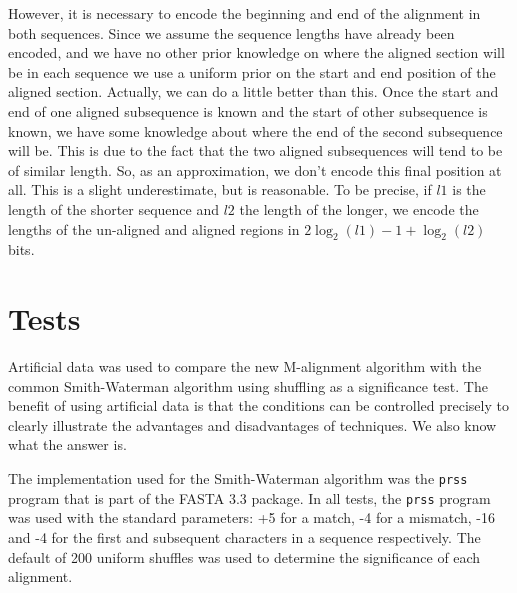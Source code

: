 \documentclass[a4paper,11pt,oneside]{article}
\begin{document}
However, it is necessary to encode the beginning and end of the alignment in
both sequences.  Since we assume the sequence lengths have already been
encoded, and we have no other prior knowledge on where the aligned section
will be in each sequence we use a uniform prior on the start and end position
of the aligned section.  Actually, we can do a little better than this.  Once
the start and end of one aligned subsequence is known and the start of other
subsequence is known, we have some knowledge about where the end of the second
subsequence will be.  This is due to the fact that the two aligned
subsequences will tend to be of similar length.  So, as an approximation, we
don't encode this final position at all.  This is a slight underestimate, but
is reasonable.  To be precise, if $l1$ is the length of the shorter sequence
and $l2$ the length of the longer, we encode the lengths of the un-aligned and
aligned regions in $2\log_2(l1) - 1 + \log_2(l2)$ bits.



\section{Tests}

Artificial data was used to compare the new M-alignment algorithm with the
common Smith-Waterman algorithm using shuffling as a significance test.  The
benefit of using artificial data is that the conditions can be controlled
precisely to clearly illustrate the advantages and disadvantages of
techniques.
We also know what the answer is.

The implementation used for the Smith-Waterman algorithm was the \verb!prss!
program that is part of the FASTA 3.3 package.  In all tests, the \verb!prss!
program was used with the standard parameters: +5 for a match, -4 for a
mismatch, -16 and -4 for the first and subsequent characters in a sequence
respectively.  The default of 200 uniform shuffles was used to determine the
significance of each alignment.
\end{document}
